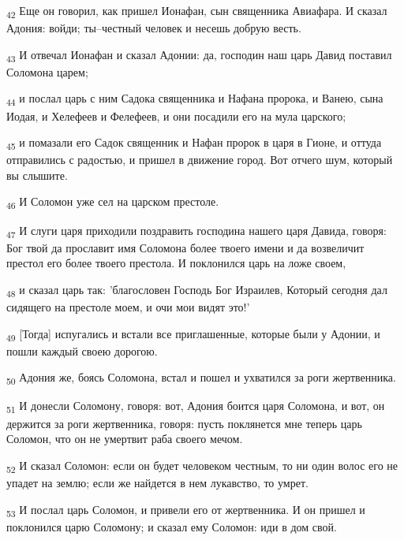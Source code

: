 \begin{tcolorbox}
\textsubscript{42} Еще он говорил, как пришел Ионафан, сын священника Авиафара. И сказал Адония: войди; ты--честный человек и несешь добрую весть.
\end{tcolorbox}
\begin{tcolorbox}
\textsubscript{43} И отвечал Ионафан и сказал Адонии: да, господин наш царь Давид поставил Соломона царем;
\end{tcolorbox}
\begin{tcolorbox}
\textsubscript{44} и послал царь с ним Садока священника и Нафана пророка, и Ванею, сына Иодая, и Хелефеев и Фелефеев, и они посадили его на мула царского;
\end{tcolorbox}
\begin{tcolorbox}
\textsubscript{45} и помазали его Садок священник и Нафан пророк в царя в Гионе, и оттуда отправились с радостью, и пришел в движение город. Вот отчего шум, который вы слышите.
\end{tcolorbox}
\begin{tcolorbox}
\textsubscript{46} И Соломон уже сел на царском престоле.
\end{tcolorbox}
\begin{tcolorbox}
\textsubscript{47} И слуги царя приходили поздравить господина нашего царя Давида, говоря: Бог твой да прославит имя Соломона более твоего имени и да возвеличит престол его более твоего престола. И поклонился царь на ложе своем,
\end{tcolorbox}
\begin{tcolorbox}
\textsubscript{48} и сказал царь так: 'благословен Господь Бог Израилев, Который сегодня дал сидящего на престоле моем, и очи мои видят это!'
\end{tcolorbox}
\begin{tcolorbox}
\textsubscript{49} [Тогда] испугались и встали все приглашенные, которые были у Адонии, и пошли каждый своею дорогою.
\end{tcolorbox}
\begin{tcolorbox}
\textsubscript{50} Адония же, боясь Соломона, встал и пошел и ухватился за роги жертвенника.
\end{tcolorbox}
\begin{tcolorbox}
\textsubscript{51} И донесли Соломону, говоря: вот, Адония боится царя Соломона, и вот, он держится за роги жертвенника, говоря: пусть поклянется мне теперь царь Соломон, что он не умертвит раба своего мечом.
\end{tcolorbox}
\begin{tcolorbox}
\textsubscript{52} И сказал Соломон: если он будет человеком честным, то ни один волос его не упадет на землю; если же найдется в нем лукавство, то умрет.
\end{tcolorbox}
\begin{tcolorbox}
\textsubscript{53} И послал царь Соломон, и привели его от жертвенника. И он пришел и поклонился царю Соломону; и сказал ему Соломон: иди в дом свой.
\end{tcolorbox}
